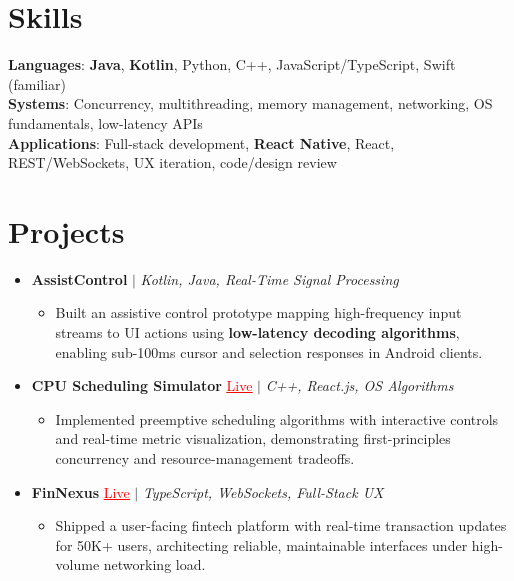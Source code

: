 \documentclass[letterpaper,10pt]{article}
\newcommand{\resumeItem}[1]{\item\small{{#1 \vspace{-2pt}}}}
\newcommand{\resumeProjectHeading}[1]{\item \small #1 \vspace{-2pt}}
\newcommand{\resumeSubHeadingListStart}{\begin{itemize}[leftmargin=0.0in, label={}]}
\newcommand{\resumeSubHeadingListEnd}{\end{itemize}}
\newcommand{\resumeProjItemListStart}{\begin{itemize}[leftmargin=0.15in,label=\textbullet,itemsep=0pt,topsep=0pt,parsep=0pt,partopsep=0pt]}
\newcommand{\resumeProjItemListEnd}{\end{itemize}\vspace{-4pt}}
\begin{document}
\section{Skills}
\begin{itemize}[leftmargin=0.15in, label={}]
\small{\item{
\textbf{Languages}: \textbf{Java}, \textbf{Kotlin}, Python, C++, JavaScript/TypeScript, Swift (familiar) \\
\textbf{Systems}: Concurrency, multithreading, memory management, networking, OS fundamentals, low-latency APIs \\
\textbf{Applications}: Full-stack development, \textbf{React Native}, React, REST/WebSockets, UX iteration, code/design review
}}
\end{itemize}
\vspace{-16pt}
\section{Projects}
\resumeSubHeadingListStart
\vspace{-2pt}
\resumeProjectHeading{\textbf{AssistControl} $|$ \emph{Kotlin, Java, Real-Time Signal Processing}}
\resumeProjItemListStart
\resumeItem{Built an assistive control prototype mapping high-frequency input streams to UI actions using \textbf{low-latency decoding algorithms}, enabling sub-100ms cursor and selection responses in Android clients.}
\resumeProjItemListEnd
\vspace{3pt}
\resumeProjectHeading{\textbf{CPU Scheduling Simulator} {\href{https://cpu-scheduler-amber.vercel.app/}{\textcolor{red}{\underline{Live}}}} $|$ \emph{C++, React.js, OS Algorithms}}
\resumeProjItemListStart
\resumeItem{Implemented preemptive scheduling algorithms with interactive controls and real-time metric visualization, demonstrating first-principles concurrency and resource-management tradeoffs.}
\resumeProjItemListEnd
\vspace{3pt}
\resumeProjectHeading{\textbf{FinNexus} {\href{https://fin-nexus.vercel.app/}{\textcolor{red}{\underline{Live}}}} $|$ \emph{TypeScript, WebSockets, Full-Stack UX}}
\resumeProjItemListStart
\resumeItem{Shipped a user-facing fintech platform with real-time transaction updates for 50K+ users, architecting reliable, maintainable interfaces under high-volume networking load.}
\resumeProjItemListEnd
\resumeSubHeadingListEnd
\end{document}
